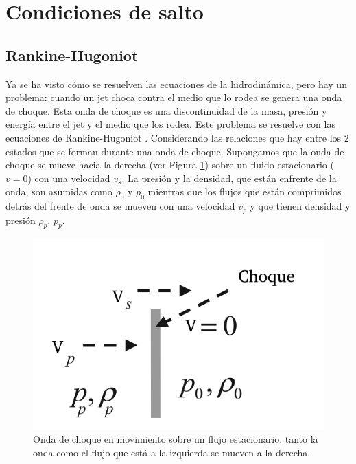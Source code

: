 \documentclass[12pt,a4paper]{book}
\begin{document}
\section{Condiciones de salto}\label{sec:Condiciones_Salto}

\subsection{Rankine-Hugoniot}

Ya se ha visto cómo se resuelven las ecuaciones de la hidrodinámica, pero hay un problema: cuando un jet  choca contra el medio que lo rodea se genera una onda de choque. 
Esta onda de choque es una discontinuidad de la masa, presión y energía entre el jet y el medio que los rodea. Este problema se resuelve con las ecuaciones de 
Rankine-Hugoniot \citep{Prunty2019}.
Considerando las relaciones que hay entre los 2 estados que se forman durante una onda de choque. Supongamos que la onda de choque se mueve 
hacia la derecha (ver Figura \ref{fig_move_shock}) sobre un fluido estacionario ($v = 0$) con una velocidad $v_s$. La presión y la densidad, que están enfrente de la onda, son asumidas como
$\rho_0$ y $p_0$ mientras que los flujos que están comprimidos detrás del frente de onda se mueven con una velocidad $v_p$ y que tienen densidad y presión $\rho_p$, $p_p$.

\begin{figure}
  \centering
  \includegraphics[scale=0.7]{./Figuras/Teoria/move_shock.png}
  \caption{Onda de choque en movimiento sobre un flujo estacionario, tanto la onda como el flujo que está a la izquierda se mueven a la derecha.}\label{fig_move_shock}
\end{figure}
  
\end{document}

